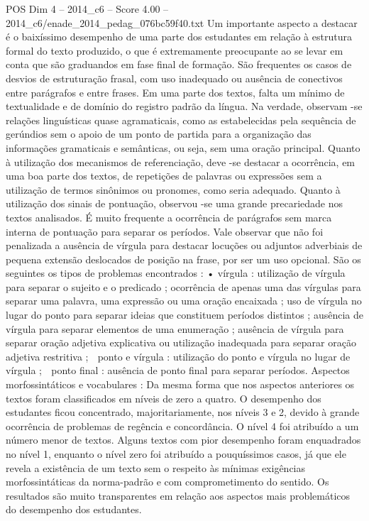 \begin{textsample}{POS Dim 4 – 2014\_c6 – Score 4.00 – 2014\_c6/enade\_2014\_pedag\_076bc59f40.txt}
Um importante aspecto a destacar é o baixíssimo desempenho de uma parte dos estudantes em relação à estrutura formal do texto produzido, o que é extremamente preocupante ao se levar em conta que são graduandos em fase final de formação.
São frequentes os casos de desvios de estruturação frasal, com uso inadequado ou ausência de conectivos entre parágrafos e entre frases.
Em uma parte dos textos, falta um mínimo de textualidade e de domínio do registro padrão da língua.
Na verdade, observam -se relações linguísticas quase agramaticais, como as estabelecidas pela sequência de gerúndios sem o apoio de um ponto de partida para a organização das informações gramaticais e semânticas, ou seja, sem uma oração principal.
Quanto à utilização dos mecanismos de referenciação, deve -se destacar a ocorrência, em uma boa parte dos textos, de repetições de palavras ou expressões sem a utilização de termos sinônimos ou pronomes, como seria adequado.
Quanto à utilização dos sinais de pontuação, observou -se uma grande precariedade nos textos analisados.
É muito frequente a ocorrência de parágrafos sem marca interna de pontuação para separar os períodos.
Vale observar que não foi penalizada a ausência de vírgula para destacar locuções ou adjuntos adverbiais de pequena extensão deslocados de posição na frase, por ser um uso opcional.
São os seguintes os tipos de problemas encontrados : • vírgula : utilização de vírgula para separar o sujeito e o predicado ; ocorrência de apenas uma das vírgulas para separar uma palavra, uma expressão ou uma oração encaixada ; uso de vírgula no lugar do ponto para separar ideias que constituem períodos distintos ; ausência de vírgula para separar elementos de uma enumeração ; ausência de vírgula para separar oração adjetiva explicativa ou utilização inadequada para separar oração adjetiva restritiva ;  ponto e vírgula : utilização do ponto e vírgula no lugar de vírgula ;  ponto final : ausência de ponto final para separar períodos.
Aspectos morfossintáticos e vocabulares : Da mesma forma que nos aspectos anteriores os textos foram classificados em níveis de zero a quatro.
O desempenho dos estudantes ficou concentrado, majoritariamente, nos níveis 3 e 2, devido à grande ocorrência de problemas de regência e concordância.
O nível 4 foi atribuído a um número menor de textos.
Alguns textos com pior desempenho foram enquadrados no nível 1, enquanto o nível zero foi atribuído a pouquíssimos casos, já que ele revela a existência de um texto sem o respeito às mínimas exigências morfossintáticas da norma-padrão e com comprometimento do sentido.
Os resultados são muito transparentes em relação aos aspectos mais problemáticos do desempenho dos estudantes.

\end{textsample}
